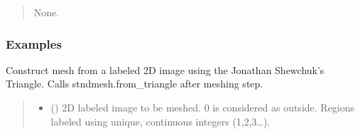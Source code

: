\documentclass[letterpaper,10pt,english]{sphinxmanual}
\begin{document}
\begin{fulllineitems}
\begin{fulllineitems}
\begin{quote}
\begin{description}
\sphinxAtStartPar
None.

\end{description}\end{quote}
\subsubsection*{Examples}

\begin{sphinxVerbatim}[commandchars=\\\{\}]
  
\end{sphinxVerbatim}

\end{fulllineitems}


\begin{fulllineitems}
\label{\detokenize{_autosummary/nirfasterff.base.dcs_mesh.dcsmesh:nirfasterff.base.dcs_mesh.dcsmesh.from_image}}
\pysigstartsignatures
\pysiglinewithargsret
{}
{\sphinxparamcomma {}\sphinxparamcomma {}\sphinxparamcomma {}\sphinxparamcomma {}\sphinxparamcomma {}}
{}
\pysigstopsignatures
\sphinxAtStartPar
Construct mesh from a labeled 2D image using the Jonathan Shewchuk’s Triangle. Calls stndmesh.from\_triangle after meshing step.
\begin{quote}\begin{description}
\begin{itemize}
\item {} 
\sphinxAtStartPar
{} (\sphinxstyleliteralemphasis{\sphinxupquote{ (}}\sphinxstyleliteralemphasis{\sphinxupquote{) }}) \textendash{} 2D labeled image to be meshed. 0 is considered as outside. Regions labeled using unique, continuous integers (1,2,3…).


\end{itemize}
\end{description}
\end{quote}
\end{fulllineitems}
\end{fulllineitems}
\end{document}
